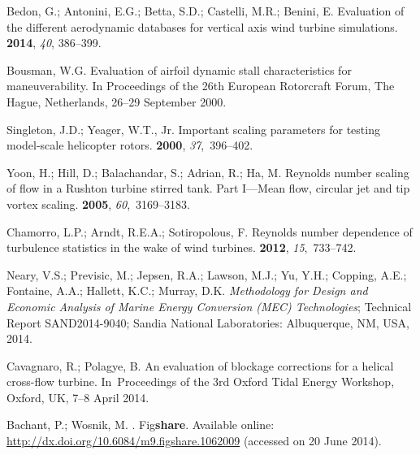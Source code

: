 \documentclass[energies,article,accept,moreauthors,pdftex,10pt,a4paper]{mdpi}
\theoremstyle{mdpi}
\newcounter{ex}
\newcounter{re}
\begin{document}
\begin{thebibliography}{999}
 Bedon, G.; Antonini, E.G.; Betta, S.D.; Castelli, M.R.;
Benini, E. \newblock Evaluation of the different aerodynamic databases for
vertical axis wind turbine simulations.  {\bf 2014}, {\em 40}, 386--399.

 Bousman, W.G. \newblock
Evaluation of airfoil dynamic stall characteristics for maneuverability.
\newblock In Proceedings of the 26th {E}uropean Rotorcraft Forum, The Hague,
Netherlands, 26--29 September 2000.

 Singleton, J.D.; Yeager,
W.T., Jr. \newblock Important scaling parameters for testing model-scale
helicopter rotors.  {\bf 2000}, {\em 37},~396--402.

 Yoon, H.; Hill, D.; Balachandar, S.; Adrian, R.; Ha, M. \newblock
Reynolds number scaling of flow in a Rushton turbine stirred tank. Part I—Mean
flow, circular jet and tip vortex scaling.  {\bf
    2005}, {\em 60},~3169--3183.

 Chamorro, L.P.; Arndt, R.E.A.; Sotiropolous, F.
\newblock Reynolds number dependence of turbulence statistics in the wake of
wind turbines.  {\bf 2012}, {\em 15},~733--742.

 Neary, V.S.; Previsic, M.; Jepsen,
R.A.; Lawson, M.J.; Yu, Y.H.; Copping, A.E.; Fontaine, A.A.; Hallett, K.C.;
Murray, D.K. \newblock \emph{Methodology for Design and Economic Analysis of
    Marine Energy Conversion ({MEC}) Technologies}; \newblock Technical Report
SAND2014-9040; Sandia National Laboratories: Albuquerque, NM, USA, 2014.

 Cavagnaro, R.; Polagye, B.
\newblock An evaluation of blockage corrections for a helical cross-flow
turbine. \newblock In~Proceedings of the 3rd Oxford Tidal Energy Workshop,
Oxford, UK, 7--8 April 2014.

 Bachant, P.; Wosnik, M.
. \newblock Fig\textbf{share}. Available online:
\url{http://dx.doi.org/10.6084/m9.figshare.1062009} (accessed on 20 June 2014).


\end{thebibliography}
\end{document}

